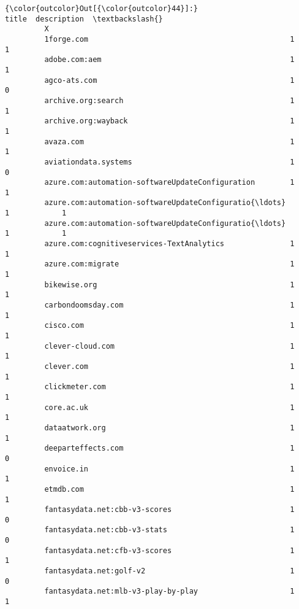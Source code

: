 \documentclass[11pt]{article}
\begin{document}
\begin{Verbatim}[commandchars=\\\{\}]
{\color{outcolor}Out[{\color{outcolor}44}]:}                                                     title  description  \textbackslash{}
         X                                                                        
         1forge.com                                              1            1   
         adobe.com:aem                                           1            1   
         agco-ats.com                                            1            0   
         archive.org:search                                      1            1   
         archive.org:wayback                                     1            1   
         avaza.com                                               1            1   
         aviationdata.systems                                    1            0   
         azure.com:automation-softwareUpdateConfiguration        1            1   
         azure.com:automation-softwareUpdateConfiguratio{\ldots}      1            1   
         azure.com:automation-softwareUpdateConfiguratio{\ldots}      1            1   
         azure.com:cognitiveservices-TextAnalytics               1            1   
         azure.com:migrate                                       1            1   
         bikewise.org                                            1            1   
         carbondoomsday.com                                      1            1   
         cisco.com                                               1            1   
         clever-cloud.com                                        1            1   
         clever.com                                              1            1   
         clickmeter.com                                          1            1   
         core.ac.uk                                              1            1   
         dataatwork.org                                          1            1   
         deeparteffects.com                                      1            0   
         envoice.in                                              1            1   
         etmdb.com                                               1            1   
         fantasydata.net:cbb-v3-scores                           1            0   
         fantasydata.net:cbb-v3-stats                            1            0   
         fantasydata.net:cfb-v3-scores                           1            1   
         fantasydata.net:golf-v2                                 1            0   
         fantasydata.net:mlb-v3-play-by-play                     1            1   

\end{Verbatim}
\end{document}
